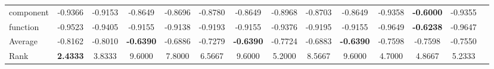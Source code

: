 \begin{threeparttable}
\begin{tabular}{lccccccccccccc}
component &-0.9366 &-0.9153 &-0.8649 &-0.8696 &-0.8780 &-0.8649 &-0.8968 &-0.8703 &-0.8649 &-0.9358 &\textbf{-0.6000} &-0.9355 &  \\
function &-0.9523 &-0.9405 &-0.9155 &-0.9138 &-0.9193 &-0.9155 &-0.9376 &-0.9195 &-0.9155 &-0.9649 &\textbf{-0.6238} &-0.9647 &  \\
\hline
Average &-0.8162 &-0.8010 &\textbf{-0.6390} &-0.6886 &-0.7279 &\textbf{-0.6390} &-0.7724 &-0.6883 &\textbf{-0.6390} &-0.7598 &-0.7598 &-0.7550 &  \\
Rank &\textbf{2.4333} &3.8333 &9.6000 &7.8000 &6.5667 &9.6000 &5.2000 &8.5667 &9.6000 &4.7000 &4.8667 &5.2333 &  \\
\bottomrule
\end{tabular}
\end{threeparttable}